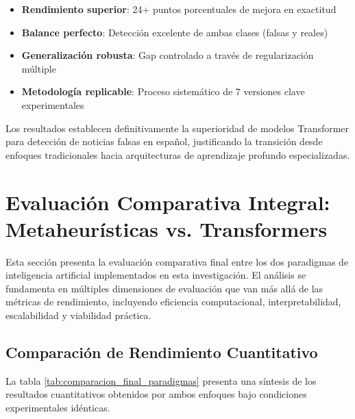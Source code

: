 \begin{itemize}
    \item \textbf{Rendimiento superior}: 24+ puntos porcentuales de mejora en exactitud
    \item \textbf{Balance perfecto}: Detección excelente de ambas clases (falsas y reales)
    \item \textbf{Generalización robusta}: Gap controlado a través de regularización múltiple
    \item \textbf{Metodología replicable}: Proceso sistemático de 7 versiones clave experimentales
\end{itemize}

Los resultados establecen definitivamente la superioridad de modelos Transformer para detección de noticias falsas en español, justificando la transición desde enfoques tradicionales hacia arquitecturas de aprendizaje profundo especializadas.

\section{Evaluación Comparativa Integral: Metaheurísticas vs. Transformers}
\label{sec:evaluacion_comparativa_integral}

Esta sección presenta la evaluación comparativa final entre los dos paradigmas de inteligencia artificial implementados en esta investigación. El análisis se fundamenta en múltiples dimensiones de evaluación que van más allá de las métricas de rendimiento, incluyendo eficiencia computacional, interpretabilidad, escalabilidad y viabilidad práctica.

\subsection{Comparación de Rendimiento Cuantitativo}

La tabla \ref{tab:comparacion_final_paradigmas} presenta una síntesis de los resultados cuantitativos obtenidos por ambos enfoques bajo condiciones experimentales idénticas.

